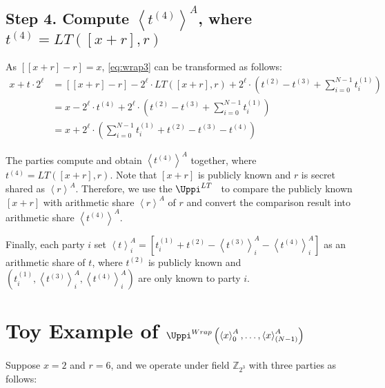 \subsection{Step 4. Compute $\left\langle t^{\left(4\right) }\right\rangle^A $, where $t^{\left(4\right) }=LT\left(\left[x+r  \right] ,  r  \right) $}
\label{wrap:step4}

As $\left[ \left[x+r\right]   -r \right]=x$, \autoref{eq:wrap3} can be transformed as follows:
\begin{equation}
    \label{eq:wrap4}
    \begin{split}
        x + t\cdot 2^{\ell} &=  \left[ \left[x+r\right]   -r \right]     -2^{\ell} \cdot LT\left( \left[x+r  \right] ,r\right)+2^{\ell}\cdot \left(t^{(2)}  -  t^{\left(3\right) } +\sum_{i=0}^{N-1} t^{(1)}_i\right)\\
        &= x-2^{\ell} \cdot t^{\left(4\right) }+2^{\ell}\cdot \left(t^{(2)}  -  t^{\left(3\right) } +\sum_{i=0}^{N-1} t^{(1)}_i\right)\\
        &= x +2^{\ell}\cdot \left(\sum_{i=0}^{N-1} t^{(1)}_i+t^{(2)}  -  t^{\left(3\right)} -t^{\left(4\right) } \right)
    \end{split}
\end{equation}

The parties compute and obtain $\left\langle t^{\left(4\right) }\right\rangle^A $ together, where $t^{\left(4\right) }=LT\left(\left[x+r  \right] ,r\right) $. Note that $\left[x+r  \right] $ is publicly known and $r$ is secret shared as $\left\langle r\right\rangle^A $. Therefore, we use the $\Uppi^{LT}$~\cite{makri2021rabbit} to compare the publicly known $ \left[x+r  \right] $ with arithmetic share $\left\langle r\right\rangle ^A $ of $r$ and convert the comparison result into arithmetic share $\left\langle t^{\left(4\right) }\right\rangle^A$.

Finally, each party $i$ set $\left\langle t\right\rangle^A_i =\left[t^{(1)}_i+t^{\left(2\right) }-\left\langle t^{(3)}\right\rangle^A_i-\left\langle t^{(4)}\right\rangle^A_i \right] $ as an arithmetic share of $t$, where $t^{(2)}$ is publicly known and $\left(t_i^{\left(1\right) },\left\langle t^{(3)}\right\rangle^A_i,\left\langle t^{(4)}\right\rangle^A_i\right) $ are only known to party $i$.


\section{Toy Example of $\Uppi^{Wrap}\left(\left\langle x\right\rangle_0^A, \ldots ,\left\langle x\right\rangle_{\left(N-1\right)}^A  \right) $}
Suppose $x=2$ and $r=6$, and we operate under field $\mathbb{Z} _{2^{3}}$ with three parties as follows:

